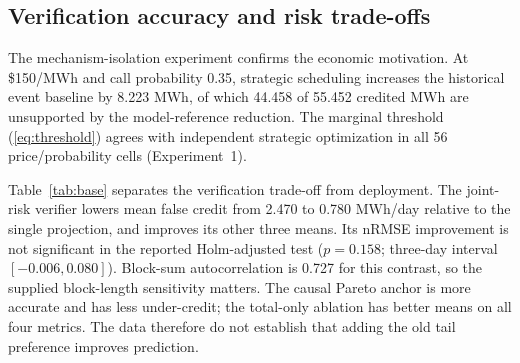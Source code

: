 \documentclass[10pt,journal]{IEEEtran}
\newcommand{\RiskSafe}{joint-risk verifier}
\begin{document}
\subsection{Verification accuracy and risk trade-offs}

The mechanism-isolation experiment confirms the economic motivation. At
\$150/MWh and call probability 0.35, strategic scheduling increases the
historical event baseline by 8.223 MWh, of which 44.458 of 55.452 credited MWh
are unsupported by the model-reference reduction. The marginal threshold
(\ref{eq:threshold}) agrees with independent strategic optimization in all 56
price/probability cells (Experiment~1).

Table~\ref{tab:base} separates the verification trade-off from deployment.
The \RiskSafe{} lowers mean false credit from 2.470 to 0.780 MWh/day relative
to the single projection, and improves its other three means. Its nRMSE
improvement is not significant in the reported Holm-adjusted test
($p=0.158$; three-day interval $[-0.006,0.080]$). Block-sum autocorrelation
is 0.727 for this contrast, so the supplied block-length sensitivity matters.
The causal Pareto anchor is more accurate and has less under-credit; the
total-only ablation has better means on all four metrics. The data therefore
do not establish that adding the old tail preference improves prediction.
\end{document}
